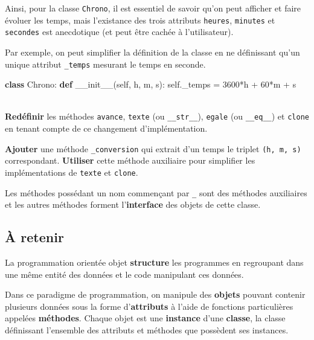 \documentclass[a4paper,17pt]{extarticle}
\newenvironment{eleve}%
{\begin{activite}\color{noiramu}\\[-0.5cm]}
{\end{activite}}
\newenvironment{Shaded}{}{}
\newcommand{\KeywordTok}[1]{\textcolor[rgb]{0.00,0.44,0.13}{\textbf{{#1}}}}
\newcommand{\DecValTok}[1]{\textcolor[rgb]{0.25,0.63,0.44}{{#1}}}
\newcommand{\FunctionTok}[1]{\textcolor[rgb]{0.02,0.16,0.49}{{#1}}}
\newcommand{\NormalTok}[1]{{#1}}
\newcommand{\VariableTok}[1]{\textcolor[rgb]{0.10,0.09,0.49}{{#1}}}
\newcommand{\OperatorTok}[1]{\textcolor[rgb]{0.40,0.40,0.40}{{#1}}}
\begin{document}
    Ainsi, pour la classe \texttt{Chrono}, il est essentiel de savoir qu'on
peut afficher et faire évoluer les temps, mais l'existance des trois
attributs \texttt{heures}, \texttt{minutes} et \texttt{secondes} est
anecdotique (et peut être cachée à l'utilisateur).
\begin{exemple}
    Par exemple, on peut simplifier la définition de la classe en ne
définissant qu'un unique attribut \texttt{\_temps} mesurant le temps en
seconde.

\begin{Shaded}
\begin{Highlighting}[]
\KeywordTok{class}\NormalTok{ Chrono:}
    \KeywordTok{def} \FunctionTok{\_\_init\_\_}\NormalTok{(}\VariableTok{self}\NormalTok{, h, m, s):}
        \VariableTok{self}\NormalTok{.\_temps }\OperatorTok{=} \DecValTok{3600}\OperatorTok{*}\NormalTok{h }\OperatorTok{+} \DecValTok{60}\OperatorTok{*}\NormalTok{m }\OperatorTok{+}\NormalTok{ s}
\end{Highlighting}
\end{Shaded}

        \end{exemple}\begin{eleve}
    \textbf{Redéfinir} les méthodes \texttt{avance}, \texttt{texte} (ou
\texttt{\_\_str\_\_}), \texttt{egale} (ou \texttt{\_\_eq\_\_}) et
\texttt{clone} en tenant compte de ce changement d'implémentation.

\textbf{Ajouter} une méthode \texttt{\_conversion} qui extrait d'un
temps le triplet \texttt{(h,\ m,\ s)} correspondant. \textbf{Utiliser}
cette méthode auxiliaire pour simplifier les implémentations de
\texttt{texte} et \texttt{clone}.
        
        \end{eleve}\begin{remarque}
    Les méthodes possédant un nom commençant par \texttt{\_} sont des
méthodes auxiliaires et les autres méthodes forment l'\textbf{interface}
des objets de cette classe.

        \end{remarque}
    \hypertarget{uxe0-retenir}{%
\subsection{À retenir}\label{uxe0-retenir}}
\begin{retenir}
    La programmation orientée objet \textbf{structure} les programmes en
regroupant dans une même entité des données et le code manipulant ces
données.

Dans ce paradigme de programmation, on manipule des \textbf{objets}
pouvant contenir plusieurs données sous la forme d'\textbf{attributs} à
l'aide de fonctions particulières appelées \textbf{méthodes}. Chaque
objet est une \textbf{instance} d'une \textbf{classe}, la classe
définissant l'ensemble des attributs et méthodes que possèdent ses
instances.

        \end{retenir}

    
    
    
\end{document}
